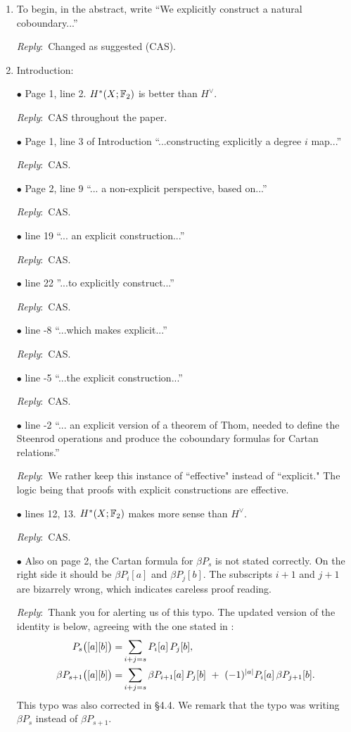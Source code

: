 \documentclass{amsart}
\newcommand{\ar}{\medskip\noindent\textit{Reply}:\ }
\def\subitem{\medskip\noindent$\bullet$ }
\begin{document}
\begin{enumerate}
	\item To begin, in the abstract, write “We explicitly construct a natural coboundary...”

	\ar Changed as suggested (CAS).

	\item Introduction:

	\subitem Page 1, line 2. $H^*(X;{\mathbb{F}_2})$ is better than $H^\vee$.

	\ar CAS throughout the paper.

	\subitem Page 1, line 3 of Introduction ``...constructing explicitly a degree $i$ map...”

	\ar CAS.

	\subitem Page 2, line 9 “... a non-explicit perspective, based on...”

	\ar CAS.

	\subitem line 19 “... an explicit construction...”

	\ar CAS.

	\subitem line 22 ”...to explicitly construct...”

	\ar CAS.

	\subitem line -8 “...which makes explicit...”

	\ar CAS.

	\subitem line -5 “...the explicit construction...”

	\ar CAS.

	\subitem line -2 “... an explicit version of a theorem of Thom, needed to define the Steenrod
	operations and produce the coboundary formulas for Cartan relations.”

	\ar We rather keep this instance of ``effective" instead of ``explicit."
	The logic being that proofs with explicit constructions are effective.

	\subitem lines 12, 13. $H^*(X;{\mathbb{F}_2})$ makes more sense than $H^\vee$.

	\ar CAS.

	\subitem Also on page 2, the Cartan formula for $\beta P_s$ is not stated correctly.
	On the right side it should be $\beta P_i[a]$ and $\beta P_j[b]$.
	The subscripts $i + 1$ and $j + 1$ are bizarrely wrong, which indicates careless proof reading.

	\ar Thank you for alerting us of this typo.
	The updated version of the identity is below, agreeing with the one stated in \cite[p.165]{may1970general}:
	\begin{align*}
		P_{s}\big([a][b]\big) =&
		\sum_{i+j=s} P_i[a] \, P_j[b], \\
		\beta P_{s+1}\big([a][b]\big) =&
		\sum_{i+j=s} \beta P_{i+1}[a] \, P_j[b] \ +\ (-1)^{\lvert a\rvert} P_i[a] \, \beta P_{j+1}[b].
	\end{align*}
	This typo was also corrected in \S4.4.
	We remark that the typo was writing $\beta P_s$ instead of $\beta P_{s+1}$.


\end{enumerate}
\end{document}
